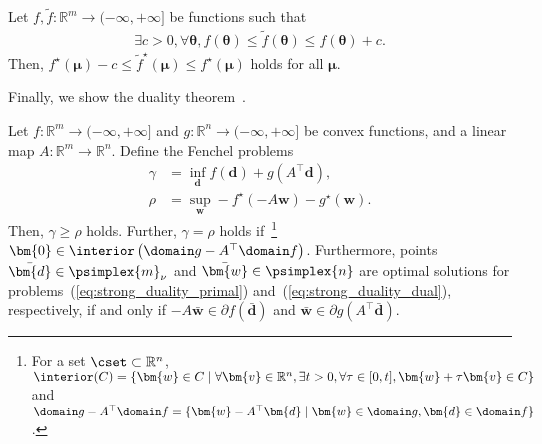 \begin{lem.}
    \label{lem:fenchel_conjugate_functions}
    Let $f, \tilde{f} : \mathbb{R}^m \to (-\infty, +\infty]$ be 
    functions such that 
    \begin{align*}
        \exists c > 0, \forall \bm{\theta},
        f(\bm{\theta}) \leq \tilde{f}(\bm{\theta}) \leq f(\bm{\theta}) + c.
    \end{align*}
    Then, 
    $
        f^\star(\bm{\mu}) - c
        \leq \tilde{f}^\star(\bm{\mu})
        \leq f^\star(\bm{\mu})
    $ holds for all $\bm{\mu}$.
\end{lem.}
Finally, we show the duality theorem~\citep{borwein+:springer06}.
\begin{thm.}
    \label{thm:strong_duality}
    Let $f : \mathbb{R}^m \to (-\infty, +\infty]$ and 
    $g : \mathbb{R}^n \to (-\infty, +\infty]$ be convex functions, 
    and a linear map $A : \mathbb{R}^m \to \mathbb{R}^n$. 
    Define the Fenchel problems
    \begin{align}
        \label{eq:strong_duality_primal}
        \gamma & = \inf_{\bm{d}} f(\bm{d}) + g(A^\top\bm{d}), \\
        \label{eq:strong_duality_dual}
        \rho   & = \sup_{\bm{w}} -f^\star(-A \bm{w}) - g^\star(\bm{w}).
    \end{align}
    Then, $\gamma \geq \rho$ holds. 
    Further, $\gamma = \rho$ holds if~\footnote{%
        For a set $\cset \subset \mathbb{R}^n$, %
        $
            \interior(C) = \{
                \bm{w} \in C \mid
                    \forall \bm{v} \in \mathbb{R}^n,
                    \exists t > 0,
                    \forall \tau \in [0, t], \bm{w} + \tau \bm{v} \in C
            \}
        $ and \\ %
        $
            \domain g - A^\top \domain f
            = \{ \bm{w} - A^\top \bm{d} \mid
                \bm{w} \in \domain g,
                \bm{d} \in \domain f
            \}
        $. %
    }
    $\bm{0} \in \interior \left(\domain g - A^\top \domain f\right)$. 
    Furthermore, points $\bar{\bm{d}} \in \psimplex{m}_{\nu}$ and 
    $\bar{\bm{w}} \in \psimplex{n}$ are optimal solutions 
    for problems~(\ref{eq:strong_duality_primal}) 
    and~(\ref{eq:strong_duality_dual}), respectively, 
    if and only if $-A \bar{\bm{w}} \in \partial f(\bar{\bm{d}})$ 
    and $\bar{\bm{w}} \in \partial g(A^\top \bar{\bm{d}})$.
\end{thm.}


